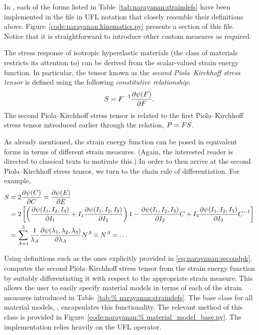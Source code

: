 In \twist, each of the forms listed in
Table~\ref{tab:narayanan:straindefs} have been implemented in the file
 in UFL notation that closely resemble their
definitions above. Figure~\ref{code:narayanan:kinematics.py} presents
a section of this file. Notice that it is straightforward to introduce
other custom measures as required.

The stress response of isotropic hyperelastic materials (the class of
materials \twist{} restricts its attention to) can be derived from the
scalar-valued strain energy function. In particular, the tensor known
as the {\em second Piola--Kirchhoff stress tensor} is defined using the
following {\em constitutive relationship}:
\begin{equation}
  \mbox{$ S$} = \mbox{$ F$}^{-1} \frac{\partial \psi(\mbox{$ F$})}{\partial \mbox{$ F$}}.
\end{equation}
The second Piola--Kirchhoff stress tensor is related to the first
Piola--Kirchhoff stress tensor introduced earlier through the relation,
$\mbox{$ P$} = \mbox{$ F$} \mbox{$ S$}$.

As already mentioned, the strain energy function can be posed in
equivalent forms in terms of different strain measures. (Again, the
interested reader is directed to classical texts to motivate this.) In
order to then arrive at the second Piola--Kirchhoff stress tensor, we
turn to the chain rule of differentiation. For example,\enlargethispage{12pt}
\begin{equation}
  \begin{split}
    \mbox{$ S$} & = 2 \frac{\partial \psi(\mbox{$ C$})}{\partial \mbox{$ C$}} =
    \frac{\partial \psi(\mbox{$ E$})}{\partial \mbox{$ E$}}\\
    & = 2\left[\left(\frac{\partial \psi (I_{1}, I_{2},
          I_{3})}{\partial I_{1}} + I_{1} \frac{\partial \psi (I_{1},
          I_{2}, I_{3})}{\partial I_{2}} \right) {1} -
      \frac{\partial \psi (I_{1}, I_{2}, I_{3})}{\partial I_{2}} \mbox{$ C$} +
      I_{3} \frac{\partial \psi (I_{1}, I_{2}, I_{3})}{\partial I_{3}}
      \mbox{$ C$}^{-1} \right]\\
    & = \sum_{A = 1}^{3} \frac{1}{\lambda_{A}} \frac{\partial
      \psi(\lambda_{1}, \lambda_{2}, \lambda_{3})}{\partial
      \lambda_{A}} \mbox{$ N$}^{A}\otimes\mbox{$ N$}^{A} = \ldots
  \end{split}
  \label{eq:narayanan:secondpk}
\end{equation}

Using definitions such as the ones explicitly provided in
\eqref{eq:narayanan:secondpk}, \twist{} computes the second
Piola--Kirchhoff stress tensor from the strain energy function by
suitably differentiating it with respect to the appropriate strain
measure. This allows the user to easily specify material models in
terms of each of the strain measures introduced in Table~\ref{tab:%
narayanan:straindefs}. The base class for all material models,
, encapsulates this functionality. The relevant
method of this class is provided in Figure~\ref{code:narayanan:%
material_model_base.py}. The implementation relies heavily on the UFL
 operator.

